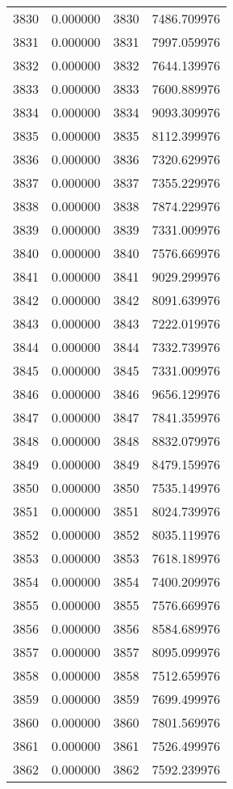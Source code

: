 \documentclass[12pt]{article}
\begin{document}
\begin{longtable}{@{}cccc@{}}
3830 & 0.000000 & 3830 & 7486.709976 \\
3831 & 0.000000 & 3831 & 7997.059976 \\
3832 & 0.000000 & 3832 & 7644.139976 \\
3833 & 0.000000 & 3833 & 7600.889976 \\
3834 & 0.000000 & 3834 & 9093.309976 \\
3835 & 0.000000 & 3835 & 8112.399976 \\
3836 & 0.000000 & 3836 & 7320.629976 \\
3837 & 0.000000 & 3837 & 7355.229976 \\
3838 & 0.000000 & 3838 & 7874.229976 \\
3839 & 0.000000 & 3839 & 7331.009976 \\
3840 & 0.000000 & 3840 & 7576.669976 \\
3841 & 0.000000 & 3841 & 9029.299976 \\
3842 & 0.000000 & 3842 & 8091.639976 \\
3843 & 0.000000 & 3843 & 7222.019976 \\
3844 & 0.000000 & 3844 & 7332.739976 \\
3845 & 0.000000 & 3845 & 7331.009976 \\
3846 & 0.000000 & 3846 & 9656.129976 \\
3847 & 0.000000 & 3847 & 7841.359976 \\
3848 & 0.000000 & 3848 & 8832.079976 \\
3849 & 0.000000 & 3849 & 8479.159976 \\
3850 & 0.000000 & 3850 & 7535.149976 \\
3851 & 0.000000 & 3851 & 8024.739976 \\
3852 & 0.000000 & 3852 & 8035.119976 \\
3853 & 0.000000 & 3853 & 7618.189976 \\
3854 & 0.000000 & 3854 & 7400.209976 \\
3855 & 0.000000 & 3855 & 7576.669976 \\
3856 & 0.000000 & 3856 & 8584.689976 \\
3857 & 0.000000 & 3857 & 8095.099976 \\
3858 & 0.000000 & 3858 & 7512.659976 \\
3859 & 0.000000 & 3859 & 7699.499976 \\
3860 & 0.000000 & 3860 & 7801.569976 \\
3861 & 0.000000 & 3861 & 7526.499976 \\
3862 & 0.000000 & 3862 & 7592.239976 \\

\end{longtable}
\end{document}
